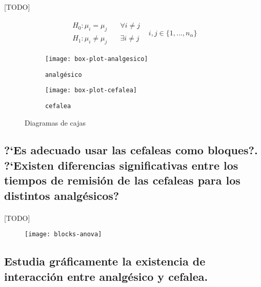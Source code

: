 \documentclass[11pt]{article}
\begin{document}
      \paragraph{}
      [TODO]

      \begin{align}
      \label{eq:1f_model_test}
        \begin{split}
          H_0: \mu_i = \mu_j &\quad  \forall i \neq j \\
          H_1: \mu_i \neq \mu_j &\quad  \exists i \neq j
        \end{split} & i,j\in \{1,...,n_\alpha\}
      \end{align}


      \begin{figure}[H]
        \centering
        \begin{subfigure}{.5\textwidth}
          \centering
          \texttt{[image: box-plot-analgesico]}
          \caption{\texttt{analgésico}}
          \label{fig:sub1}
        \end{subfigure}%
        \begin{subfigure}{.5\textwidth}
          \centering
          \texttt{[image: box-plot-cefalea]}
          \caption{\texttt{cefalea}}
          \label{fig:sub2}
        \end{subfigure}
        \caption{Diagramas de cajas}
        \label{fig:test}
      \end{figure}


    \subsection{?`Es adecuado usar las cefaleas como bloques?. ?`Existen diferencias significativas entre los tiempos de remisión de las cefaleas para los distintos analgésicos?}

      \paragraph{}
      [TODO]

      \begin{figure}[H]
        \centering
        \texttt{[image: blocks-anova]}
        \caption{}
        \label{}
      \end{figure}

    \subsection{Estudia gráficamente la existencia de interacción entre analgésico y cefalea.}
\end{document}

